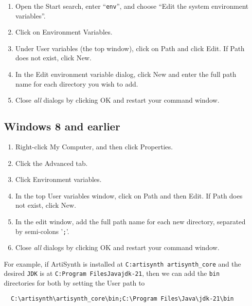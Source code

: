 \documentclass{article}
\begin{document}
\begin{enumerate}

\item Open the {\sf Start} search, enter ``{\tt env}'', and choose
{\sf ``Edit the system environment variables''}.

\item Click on {\sf Environment Variables}.

\item Under {\sf User variables} (the top window), click on {\sf Path}
and click {\sf Edit}. If {\sf Path} does not exist, click {\sf New}.

\item In the {\sf Edit environment variable} dialog, click {\sf New}
and enter the full path name for each directory you wish to add.

\item Close {\it all} dialogs by clicking {\sf OK} and restart 
your command window.

\end{enumerate}

\subsection{Windows 8 and earlier}

\begin{enumerate}

\item Right-click {\sf My Computer}, and then click {\sf Properties}.

\item Click the {\sf Advanced} tab.

\item Click {\sf Environment variables}.

\item In the top {\sf User variables} window, click on {\sf Path} and 
then {\sf Edit}. If {\sf Path} does not exist, click {\sf New}.

\item In the edit window, add the full path name for each new directory,
separated by semi-colons '{\tt ;}'.

\item Close {\it all} dialogs by clicking {\sf OK} and restart 
your command window.

\end{enumerate}

For example, if ArtiSynth is installed at {\tt C:\BKS artisynth\BKS
artisynth\_core} and the desired {\tt JDK} is at {\tt C:\BKS Program
Files\BKS Java\BKS jdk-21}, then we can add the {\tt bin}
directories for both by setting the User path to
\begin{verbatim}
  C:\artisynth\artisynth_core\bin;C:\Program Files\Java\jdk-21\bin
\end{verbatim}
\end{document}
